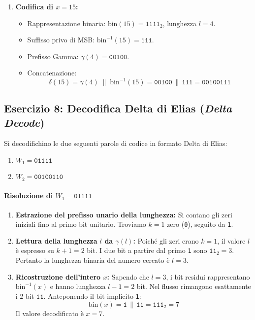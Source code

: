 \begin{enumerate}
  \item \textbf{Codifica di $x = 15$:}
  \begin{itemize}
    \item Rappresentazione binaria: $\text{bin}(15) = \texttt{1111}_2$, lunghezza $l = 4$.
    \item Suffisso privo di MSB: $\text{bin}^{-1}(15) = \texttt{111}$.
    \item Prefisso Gamma: $\gamma(4) = \texttt{00100}$.
    \item Concatenazione:
    \begin{equation*}
      \delta(15) = \gamma(4) \;\|\; \text{bin}^{-1}(15) = \texttt{00100} \,\|\, \texttt{111} = \texttt{00100111}
    \end{equation*}
  \end{itemize}
\end{enumerate}

\FloatBarrier
\subsection{Esercizio 8: Decodifica Delta di Elias (\textit{Delta Decode})}
\label{subsec:es8-elias-delta-decode}

\begin{example}
Si decodifichino le due seguenti parole di codice in formato Delta di Elias:
\begin{enumerate}
  \item $W_1 = \texttt{01111}$
  \item $W_2 = \texttt{00100110}$
\end{enumerate}
\end{example}

\paragraph{Risoluzione di $W_1 = \texttt{01111}$}
\begin{enumerate}
  \item \textbf{Estrazione del prefisso unario della lunghezza:} Si contano gli zeri iniziali fino al primo bit unitario. Troviamo $k = 1$ zero (\texttt{0}), seguito da \texttt{1}.
  \item \textbf{Lettura della lunghezza $l$ da $\gamma(l)$:} Poich\'e gli zeri erano $k = 1$, il valore $l$ \`e espresso su $k + 1 = 2$ bit. I due bit a partire dal primo \texttt{1} sono $\texttt{11}_2 = 3$. Pertanto la lunghezza binaria del numero cercato \`e $l = 3$.
  \item \textbf{Ricostruzione dell'intero $x$:} Sapendo che $l = 3$, i bit residui rappresentano $\text{bin}^{-1}(x)$ e hanno lunghezza $l - 1 = 2$ bit. Nel flusso rimangono esattamente i 2 bit $\texttt{11}$. Anteponendo il bit implicito \texttt{1}:
  \begin{equation*}
    \text{bin}(x) = \texttt{1} \,\|\, \texttt{11} = \texttt{111}_2 = 7
  \end{equation*}
  Il valore decodificato \`e $x = 7$.
\end{enumerate}

